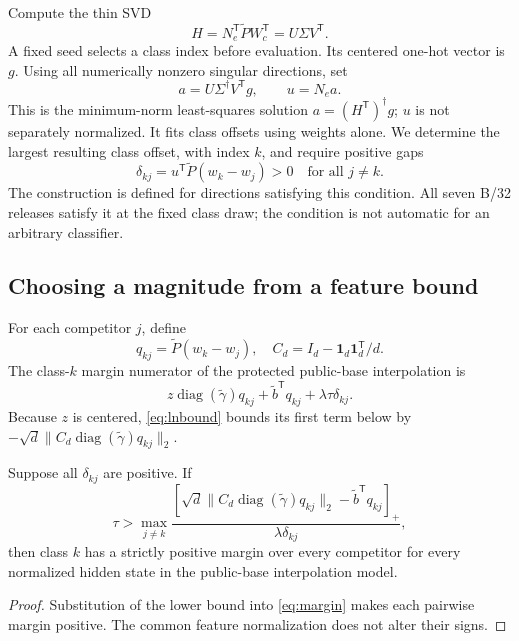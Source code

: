 Compute the thin SVD
\begin{equation}
 H=N_e^{\mathsf T}\widetilde P W_c^{\mathsf T}=U\Sigma V^{\mathsf T}.
\end{equation}
A fixed seed selects a class index before evaluation. Its centered one-hot vector is $g$. Using all numerically nonzero singular directions, set
\begin{equation}
 a=U\Sigma^{\dagger}V^{\mathsf T}g,\qquad u=N_ea.
 \label{eq:direction}
\end{equation}
This is the minimum-norm least-squares solution $a=(H^{\mathsf T})^\dagger g$; $u$ is not separately normalized. It fits class offsets using weights alone. We determine the largest resulting class offset, with index $k$, and require positive gaps
\begin{equation}
 \delta_{kj}=u^{\mathsf T}\widetilde P(w_k-w_j)>0
 \quad\text{for all }j\neq k.
\end{equation}
The construction is defined for directions satisfying this condition. All seven B/32 releases satisfy it at the fixed class draw; the condition is not automatic for an arbitrary classifier.

\subsection{Choosing a magnitude from a feature bound}
For each competitor $j$, define
\begin{equation}
 q_{kj}=\widetilde P(w_k-w_j),\quad
 C_d=I_d-\mathbf{1}_d\mathbf{1}_d^{\mathsf T}/d.
\end{equation}
The class-$k$ margin numerator of the protected public-base interpolation is
\begin{equation}
 z\operatorname{diag}(\widetilde\gamma)q_{kj}
 +\widetilde b^{\mathsf T}q_{kj}
 +\lambda\tau\delta_{kj}.
 \label{eq:margin}
\end{equation}
Because $z$ is centered, \cref{eq:lnbound} bounds its first term below by $-\sqrt d\|C_d\operatorname{diag}(\widetilde\gamma)q_{kj}\|_2$.

\begin{proposition}
Suppose all $\delta_{kj}$ are positive. If
\begin{equation}
\tau > \max_{j\neq k}
\frac{[\sqrt d\|C_d\operatorname{diag}(\widetilde\gamma)q_{kj}\|_2
-\widetilde b^{\mathsf T}q_{kj}]_+}{\lambda\delta_{kj}},
\label{eq:magnitude}
\end{equation}
then class $k$ has a strictly positive margin over every competitor for every normalized hidden state in the public-base interpolation model.
\end{proposition}
\begin{proof}
Substitution of the lower bound into \cref{eq:margin} makes each pairwise margin positive. The common feature normalization does not alter their signs.
\end{proof}

